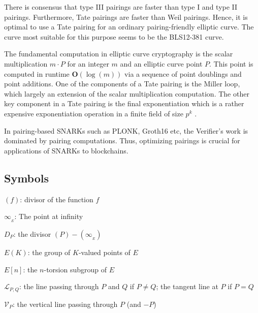 \documentclass[11pt, lettersize, notitlepage, leqno, footskip=0.6cm]{article}
\newcommand{\mc}{\mathcal}
\newcommand{\mbf}{\mathbf}
\newcommand{\bO}{\mbf{O}}
\newcommand{\noin}{\noindent}
\numberwithin{equation}{section}
\begin{document}
There is consensus that type III pairings are faster than type I and type II pairings. Furthermore, Tate pairings are faster than Weil pairings. Hence, it is optimal to use a Tate pairing for an ordinary pairing-friendly elliptic curve. The curve most suitable for this purpose seems to be the BLS12-381 curve.

The fundamental computation in elliptic curve cryptography is the scalar multiplication $m\cdot P$ for an integer $m$ and an elliptic curve point $P$. This point is computed in runtime $\bO(\log(m))$ via a sequence of point doublings and point additions. One of the components of a Tate pairing is the Miller loop, which largely an extension of the scalar multiplication computation. The other key component in a Tate pairing is the final exponentiation which is a rather expensive exponentiation operation in a finite field of size $p^k$ .  

In pairing-based SNARKs such as PLONK, Groth16 etc, the Verifier's work is dominated by pairing computations. Thus, optimizing pairings is crucial for applications of SNARKs to blockchains.











\subsection{\fontsize{11}{11}\selectfont Symbols}

\noin $(f)$: divisor of the function $f$ \vspace{2mm}

\noin $\infty_{_E}$: The point at infinity \vspace{2mm}

\noin $D_P$: the divisor $(P)-(\infty_{_E})$ \vspace{2mm}

\noin $E(K)$: the group of $K$-valued points of $E$ \vspace{2mm}

\noin $E[n]$: the $n$-torsion subgroup of $E$ \vspace{2mm}

\noin $\mc{L}_{P,Q}$: the line passing through $P$ and $Q$ if $P\neq Q$; the tangent line at $P$ if $P = Q$ \vspace{2mm}

\noin $\mc{V}_{P}$: the vertical line passing through $P$ (and $-P$) \vspace{2mm}
\end{document}
